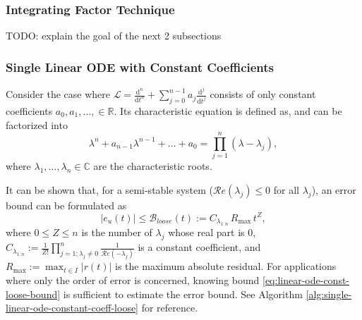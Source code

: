 \documentclass[accepted]{uai2023}
\newcommand{\Err}{e}
\newcommand{\Bound}{\mathcal{B}}
\renewcommand{\L}{\mathcal{L}}
\renewcommand{\Re}[1]{\mathcal{R}e\left(#1\right)}
\begin{document}
\subsubsection{Integrating Factor Technique}
    TODO: explain the goal of the next 2 subsections
\subsubsection{Single Linear ODE with Constant Coefficients}\label{section:single-linear-ode-with-constant-coefficients}
    Consider the case where $\L = \frac{\mathrm{d}^n}{\mathrm{d}t^n} + \sum_{j=0}^{n - 1} a_j \frac{\mathrm{d}^j}{\mathrm{d}t^j}$ consists of only constant coefficients $a_0, a_1, \dots, \in \mathbb{R}$.
    Its characteristic equation is defined as, and can be factorized into
    {
        \small
        \begin{equation} \label{eq:single-linear-ode-characteristic-polynomial-factorization}
            \lambda^n + a_{n-1}\lambda^{n-1} + \dots + a_0 = \prod_{j=1}^{n}(\lambda - \lambda_j),
        \end{equation}
    }
    where $\lambda_1, \dots, \lambda_n \in \mathbb{C}$ are the characteristic roots. 

    It can be shown that, for a semi-stable system ($\Re{\lambda_j} \leq 0$ for all $\lambda_j$), an error bound can be formulated as
    \begin{equation} \label{eq:linear-ode-const-loose-bound}
        \left|\Err_u(t)\right| \leq \Bound_{loose}(t) := C_{\lambda_{1:n}}\, R_{\max}\, t^{Z},
    \end{equation}
    where $0\leq Z \leq n$ is the number of $\lambda_j$ whose real part is $0$, $C_{\lambda_{1:n}} := \frac{1}{Z!}\prod_{j=1; \lambda_j\neq 0}^{n} \frac{1}{\Re{-\lambda_j}}$ is a constant coefficient, and $R_{\max}:=\max_{t\in I} |r(t)|$ is the maximum absolute residual. 
    For applications where only the order of error is concerned, knowing bound \ref{eq:linear-ode-const-loose-bound} is sufficient to estimate the error bound. See Algorithm \ref{alg:single-linear-ode-constant-coeff-loose} for reference.
\end{document}
